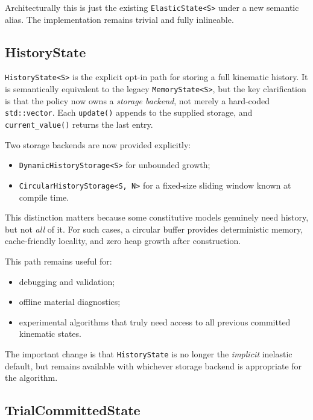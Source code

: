 Architecturally this is just the existing \texttt{ElasticState<S>} under a new
semantic alias.  The implementation remains trivial and fully inlineable.

\subsection{HistoryState}

\texttt{HistoryState<S>} is the explicit opt-in path for storing a full
kinematic history.  It is semantically equivalent to the legacy
\texttt{MemoryState<S>}, but the key clarification is that the policy now owns
a \emph{storage backend}, not merely a hard-coded \texttt{std::vector}.  Each
\texttt{update()} appends to the supplied storage, and
\texttt{current\_value()} returns the last entry.

Two storage backends are now provided explicitly:

\begin{itemize}
  \item \texttt{DynamicHistoryStorage<S>} for unbounded growth;
  \item \texttt{CircularHistoryStorage<S, N>} for a fixed-size sliding window
        known at compile time.
\end{itemize}

This distinction matters because some constitutive models genuinely need
history, but not \emph{all} of it.  For such cases, a circular buffer provides
deterministic memory, cache-friendly locality, and zero heap growth after
construction.

This path remains useful for:

\begin{itemize}
  \item debugging and validation;
  \item offline material diagnostics;
  \item experimental algorithms that truly need access to all previous
        committed kinematic states.
\end{itemize}

The important change is that \texttt{HistoryState} is no longer the
\emph{implicit} inelastic default, but remains available with whichever
storage backend is appropriate for the algorithm.

\subsection{TrialCommittedState}

